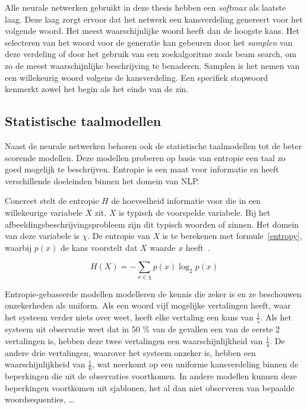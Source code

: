 Alle neurale netwerken gebruikt in deze thesis hebben een \emph{softmax} als laatste laag. Deze laag zorgt ervoor dat het netwerk een kansverdeling genereert voor het volgende woord. Het meest waarschijnlijke woord heeft dan de hoogste kans.
Het selecteren van het woord voor de generatie kan gebeuren door het \emph{samplen} van deze verdeling of door het gebruik van een zoekalgoritme zoals beam search, om zo de meest waarschijnlijke beschrijving te benaderen. Samplen is het nemen van een willekeurig woord volgens de kansverdeling. Een specifiek stopwoord kenmerkt zowel het begin als het einde van de zin.

\subsection{Statistische taalmodellen}
Naast de neurale netwerken behoren ook de statistische taalmodellen tot de beter scorende modellen. Deze modellen proberen op basis van entropie een taal zo goed mogelijk te beschrijven. Entropie is een maat voor informatie en heeft verschillende doeleinden binnen het domein van NLP. 

Concreet stelt de entropie $H$ de hoeveelheid informatie voor die in een willekeurige variabele $X$ zit. $X$ is typisch de voorspelde variabele. Bij het afbeeldingsbeschrijvingsprobleem zijn dit typisch woorden of zinnen. Het domein van deze variabele is $\chi$. De entropie van $X$ is te berekenen met formule~\eqref{entropy}, waarbij $p(x)$ de kans voorstelt dat $X$ waarde $x$ heeft~\cite{Jurafsky:2009:SLP:1214993}. 

\begin{equation}
     H(X) = -\sum_{x \in \chi}p(x)\log_2p(x)
     \label{entropy}
 \end{equation} 

Entropie-gebaseerde modellen modelleren de kennis die zeker is en ze beschouwen onzekerheden als uniform. Als een woord vijf mogelijke vertalingen heeft, waar het systeem verder niets over weet, heeft elke vertaling een kans van $\frac{1}{5}$. Als het systeem uit observatie weet dat in 50 \% van de gevallen een van de eerste 2 vertalingen is, hebben deze twee vertalingen een waarschijnlijkheid van $\frac{1}{4}$. De andere drie vertalingen, waarover het systeem onzeker is, hebben een waarschijnlijkheid van $\frac{1}{6}$, wat neerkomt op een uniforme kansverdeling binnen de beperkingen die uit de observaties voortkomen. In andere modellen kunnen deze beperkingen voortkomen uit sjablonen, het al dan niet observeren van bepaalde woordsequenties, \ldots~\cite{Berger1996}

